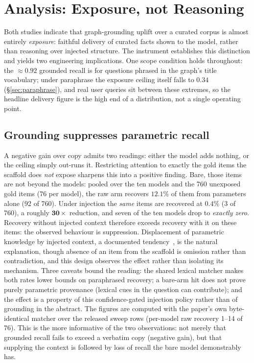 \documentclass[10pt,twocolumn]{article}
\begin{document}
\section{Analysis: Exposure, not Reasoning}\label{sec:analysis}
Both studies indicate that graph-grounding uplift over a curated corpus is almost entirely \emph{exposure}: faithful delivery of curated facts shown to the model, rather than reasoning over injected structure. The instrument establishes this distinction and yields two engineering implications. One scope condition holds throughout: the $\approx0.92$ grounded recall is for questions phrased in the graph's title vocabulary; under paraphrase the exposure ceiling itself falls to $0.34$ (\S\ref{sec:paraphrase}), and real user queries sit between these extremes, so the headline delivery figure is the high end of a distribution, not a single operating point.

\subsection{Grounding suppresses parametric recall}\label{sec:suppression}
A negative gain over copy admits two readings: either the model adds nothing, or the ceiling simply out-runs it. Restricting attention to exactly the gold items the scaffold does \emph{not} expose sharpens this into a positive finding. Bare, those items are not beyond the models: pooled over the ten models and the 760 unexposed gold items (76 per model), the raw arm recovers $\mathbf{12.1\%}$ of them from parameters alone (92 of 760). Under injection the \emph{same} items are recovered at $\mathbf{0.4\%}$ (3 of 760), a roughly $\mathbf{30\times}$ reduction, and seven of the ten models drop to \emph{exactly zero}. Recovery without injected context therefore exceeds recovery with it on these items: the observed behaviour is suppression. Displacement of parametric knowledge by injected context, a documented tendency~\cite{shi2023distracted,yoran2024robust,longpre2021entity}, is the natural explanation, though absence of an item from the scaffold is omission rather than contradiction, and this design observes the effect rather than isolating its mechanism. Three caveats bound the reading: the shared lexical matcher makes both rates lower bounds on paraphrased recovery; a bare-arm hit does not prove purely parametric provenance (lexical cues in the question can contribute); and the effect is a property of this confidence-gated injection policy rather than of grounding in the abstract. The figures are computed with the paper's own byte-identical matcher over the released sweep rows (per-model raw recovery 1--14 of 76). This is the more informative of the two observations: not merely that grounded recall fails to exceed a verbatim copy (negative gain), but that supplying the context is followed by loss of recall the bare model demonstrably has.
\end{document}
